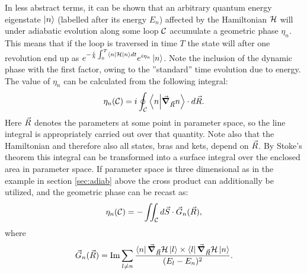 \documentclass[main.tex]{subfiles}
\begin{document}
In less abstract terms, it can be shown that an arbitrary quantum energy eigenstate \(\ket{n}\)
(labelled after its energy \(E_n\)) affected by the Hamiltonian \(\mathbb{\cal H}\) will under adiabatic evolution along some loop
\(\mathbb{\cal C}\) accumulate a geometric phase \(\eta_n\). This means that if the loop is
traversed in time \(T\) the state will after one revolution end up as
\(e^{-\frac{i}{\hbar{}}\int_0^T \bra{n}\mathbb{\cal H}\ket{n} dt} e^{i\eta_n}\ket{n}\). Note
the inclusion of the dynamic phase with the first factor, owing to the ''standard'' time
evolution due to energy. The
value of \(\eta_n\) can be calculated from the following
integral\cite{berry1984}:
\begin{align}\label{eq:etaline}
        \eta_n(\mathbb{\cal C}) = i\oint_{\mathbb{\cal C}}
        \bra{n}\ket{\grad_{\vec{R}}n}\cdot  d \vec{R}
.\end{align}
Here \(\vec{R}\) denotes the parameters at some point in parameter space, so the line integral is
appropriately carried out over that quantity. Note also that the Hamiltonian and therefore
also all states, bras and kets, depend on \(\vec{R}\). By Stoke's theorem this integral can be
transformed into a surface integral over the enclosed area in parameter space. If parameter
space is three dimensional as in the example in section \ref{sec:adiab} above the cross product can additionally be
utilized, and the geometric phase can be recast as:
\begin{align}\label{eq:etasurf}
        \eta_n(\mathbb{\cal C}) = -\iint_{\mathbb{\cal
        C}}d \vec{S} \cdot \vec{G}_n(\vec{R})
,\end{align}
where
\begin{align}\label{eq:synmag}
        \vec{G}_n(\vec{R}) = \Im \sum_{l \ne n}
        \frac{\bra{n}\grad_{\vec{R}}\mathbb{\cal H}\ket{l}\times
                \bra{l}\grad_{\vec{R}}\mathbb{\cal H}\ket{n}}{(E_l -
                        E_n)^{2}}
.\end{align}
\end{document}
